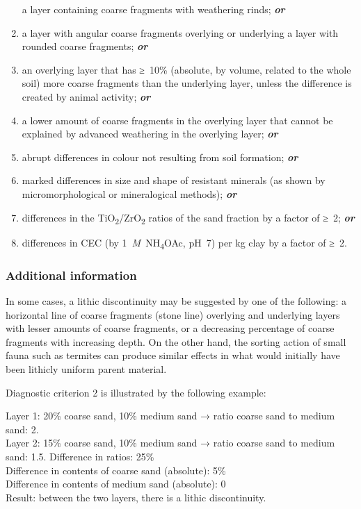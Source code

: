 \documentclass[
  letterpaper,
  DIV=11,
  numbers=noendperiod]{scrreprt}
\begin{document}
\begin{enumerate}
  a layer containing coarse fragments with weathering rinds;
  \textbf{\emph{or}}
\item
  a layer with angular coarse fragments overlying or underlying a layer
  with rounded coarse fragments; \textbf{\emph{or}}
\item
  an overlying layer that has ≥~10\% (absolute, by volume, related to
  the whole soil) more coarse fragments than the underlying layer,
  unless the difference is created by animal activity;
  \textbf{\emph{or}}
\item
  a lower amount of coarse fragments in the overlying layer that cannot
  be explained by advanced weathering in the overlying layer;
  \textbf{\emph{or}}
\item
  abrupt differences in colour not resulting from soil formation;
  \textbf{\emph{or}}
\item
  marked differences in size and shape of resistant minerals (as shown
  by micromorphological or mineralogical methods); \textbf{\emph{or}}
\item
  differences in the TiO\textsubscript{2}/ZrO\textsubscript{2} ratios of
  the sand fraction by a factor of ≥~2; \textbf{\emph{or}}
\item
  differences in CEC (by 1~\emph{M}~NH\textsubscript{4}OAc, pH~7) per kg
  clay by a factor of ≥~2.
\end{enumerate}

\hypertarget{additional-information-26}{%
\subsubsection{Additional information}\label{additional-information-26}}

In some cases, a lithic discontinuity may be suggested by one of the
following: a horizontal line of coarse fragments (stone line) overlying
and underlying layers with lesser amounts of coarse fragments, or a
decreasing percentage of coarse fragments with increasing depth. On the
other hand, the sorting action of small fauna such as termites can
produce similar effects in what would initially have been lithicly
uniform parent material.

Diagnostic criterion 2 is illustrated by the following example:

Layer 1: 20\% coarse sand, 10\% medium sand → ratio coarse sand to
medium sand: 2.\\
Layer 2: 15\% coarse sand, 10\% medium sand → ratio coarse sand to
medium sand: 1.5. Difference in ratios: 25\%\\
Difference in contents of coarse sand (absolute): 5\%\\
Difference in contents of medium sand (absolute): 0\\
Result: between the two layers, there is a lithic discontinuity.
\end{document}
